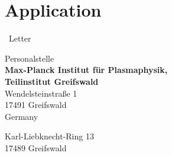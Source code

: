 \documentclass[11pt,a4paper]{moderncv}
\begin{document}
	\chapter{Application}{~Letter}

	\vspace*{1.0cm}
	\begin{minipage}{0.6\textwidth}
		\begin{flushleft}
			Personalstelle\\[0.2cm]
			{\bfseries{\color{firstnamecolor}%
				Max-Planck Institut für Plasmaphysik,\\[0.1cm]%
				Teilinstitut Greifswald%
			}}\\[0.2cm]
			Wendelsteinstraße 1\\
			17491 Greifswald\\
			Germany
		\end{flushleft}
	\end{minipage}
	\hfill
	\begin{minipage}{0.3\textwidth}
		\begin{flushright}
			\vspace*{1.3cm}
			Karl-Liebknecht-Ring 13\\
			17489 Greifswald
		\end{flushright}
	\end{minipage}
	
\end{document}
